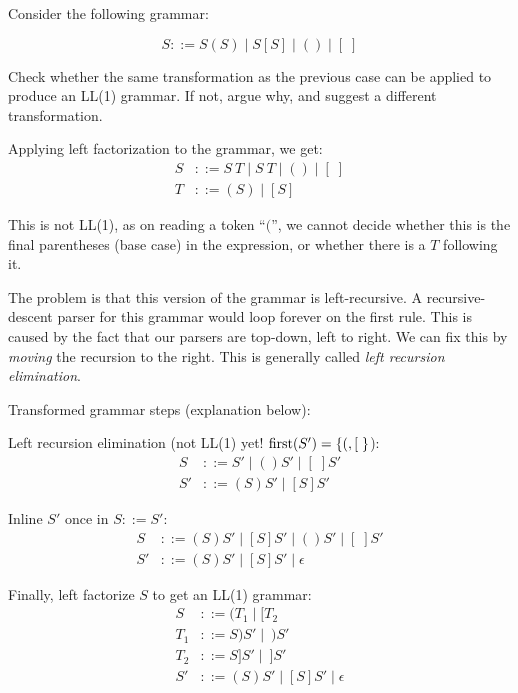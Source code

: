 \begin{exercise}{}
  Consider the following grammar:

  \begin{equation*}
    S ::= S(S) \mid S[S] \mid () \mid [\;]
  \end{equation*}
    
  Check whether the same transformation as the previous case can be applied to
  produce an LL(1) grammar. If not, argue why, and suggest a different
  transformation.

  \begin{solution}
    Applying left factorization to the grammar, we get:
    \begin{align*}
      S &::= S ~T \mid S ~T \mid () \mid [\;] \\
      T &::= (S) \mid [S]
    \end{align*}

    This is not LL(1), as on reading a token ``\((\)'', we cannot decide whether
    this is the final parentheses (base case) in the expression, or whether
    there is a \(T\) following it.

    The problem is that this version of the grammar is left-recursive. A
    recursive-descent parser for this grammar would loop forever on the first
    rule. This is caused by the fact that our parsers are top-down, left to
    right. We can fix this by \emph{moving} the recursion to the right. This is
    generally called \emph{left recursion elimination}.

    Transformed grammar steps (explanation below):

    Left recursion elimination (not LL(1) yet! \(\operatorname{first}(S') = \{(, [\;\}\)):
    \begin{align*}
      S &::= S' \mid ()S' \mid [\;]S' \\
      S' &::= (S)S' \mid [S]S'
    \end{align*}

    Inline \(S'\) once in \(S ::= S'\):
    \begin{align*}
      S &::= (S)S' \mid [S]S' \mid ()S' \mid [\;]S' \\
      S' &::= (S)S' \mid [S]S' \mid \epsilon
    \end{align*}

    Finally, left factorize \(S\) to get an LL(1) grammar:
    \begin{align*}
      S &::= (T_1 \mid [T_2 \\
      T_1 &::= S)S' \mid ~)S' \\
      T_2 &::= S]S' \mid ~]S' \\
      S' &::= (S)S' \mid [S]S' \mid \epsilon
    \end{align*}


\end{solution}
\end{exercise}
